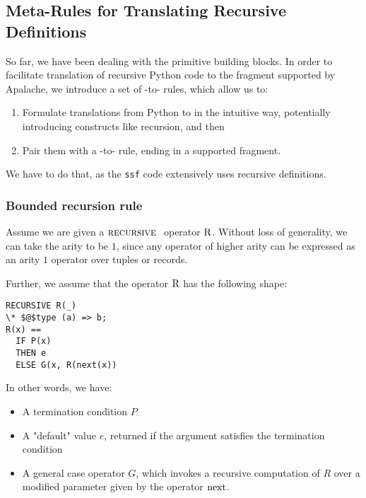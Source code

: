\subsection{Meta-Rules for Translating Recursive Definitions}
\label{subsec:recrules}

So far, we have been dealing with the primitive building blocks. In order to
facilitate translation of recursive Python code to the \tlap{} fragment
supported by Apalache, we introduce a set of \tlap{}-to-\tlap{} rules, which
allow us to:

\begin{enumerate}
  \item Formulate translations from Python to \tlap{} in the
    intuitive way, potentially introducing constructs like recursion, and then

  \item Pair them with a \tlap{}-to-\tlap{} rule, ending in a supported
      fragment.

\end{enumerate}

We have to do that, as the \texttt{ssf} code extensively uses recursive
definitions.

\subsubsection{Bounded recursion rule}

Assume we are given a $\textsc{recursive }$ operator $\mathrm{R}$. Without loss of generality,
we can take the arity to be $1$, since any operator of higher arity can be
expressed as an arity $1$ operator over tuples or records.

Further, we assume that the operator $\mathrm{R}$ has the following shape:

\begin{lstlisting}[language=tla,columns=fullflexible]
RECURSIVE R(_)
\* $@$type (a) => b;
R(x) ==
  IF P(x)
  THEN e
  ELSE G(x, R(next(x))
\end{lstlisting}
%

In other words, we have:

\begin{itemize}
  \item A termination condition $P$
  \item A "default" value $e$, returned if the argument satisfies the termination condition
  \item A general case operator $G$, which invokes a recursive computation of $R$ over a modified parameter given by the operator $\mathrm{next}$.
\end{itemize}
%

